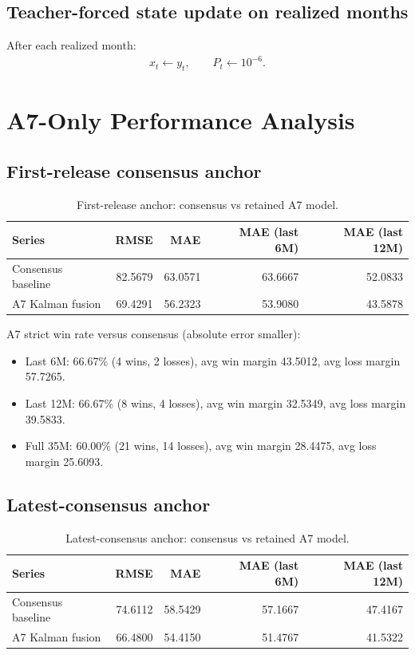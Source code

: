 \documentclass[11pt]{article}
\begin{document}
\subsection{Teacher-forced state update on realized months}
After each realized month:
\begin{align}
x_t \leftarrow y_t,\qquad P_t \leftarrow 10^{-6}.
\end{align}

\section{A7-Only Performance Analysis}
\subsection{First-release consensus anchor}
\begin{table}[h!]
\centering
\begin{tabular}{lrrrr}
\toprule
Series & RMSE & MAE & MAE (last 6M) & MAE (last 12M) \\
\midrule
Consensus baseline & 82.5679 & 63.0571 & 63.6667 & 52.0833 \\
A7 Kalman fusion & 69.4291 & 56.2323 & 53.9080 & 43.5878 \\
\bottomrule
\end{tabular}
\caption{First-release anchor: consensus vs retained A7 model.}
\end{table}

A7 strict win rate versus consensus (absolute error smaller):
\begin{itemize}
    \item Last 6M: 66.67\% (4 wins, 2 losses), avg win margin 43.5012, avg loss margin 57.7265.
    \item Last 12M: 66.67\% (8 wins, 4 losses), avg win margin 32.5349, avg loss margin 39.5833.
    \item Full 35M: 60.00\% (21 wins, 14 losses), avg win margin 28.4475, avg loss margin 25.6093.
\end{itemize}

\subsection{Latest-consensus anchor}
\begin{table}[h!]
\centering
\begin{tabular}{lrrrr}
\toprule
Series & RMSE & MAE & MAE (last 6M) & MAE (last 12M) \\
\midrule
Consensus baseline & 74.6112 & 58.5429 & 57.1667 & 47.4167 \\
A7 Kalman fusion & 66.4800 & 54.4150 & 51.4767 & 41.5322 \\
\bottomrule
\end{tabular}
\caption{Latest-consensus anchor: consensus vs retained A7 model.}
\end{table}
\end{document}
